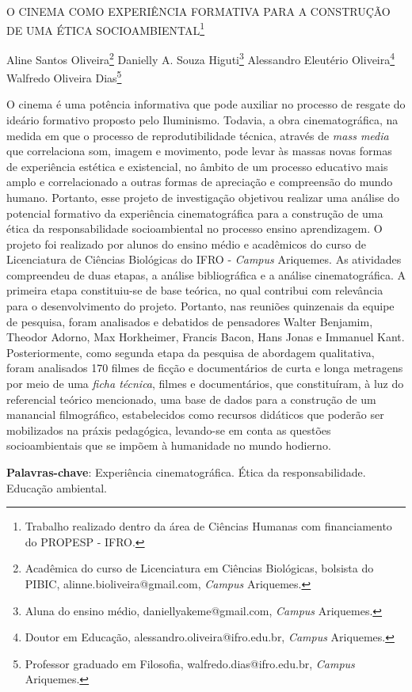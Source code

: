 \documentclass[article,12pt,onesidea,4paper,english,brazil]{abntex2}
\begin{document}
	
	
	\frenchspacing 
	
	\begin{center}
		\LARGE O CINEMA COMO EXPERIÊNCIA FORMATIVA PARA A CONSTRUÇÃO DE UMA
		ÉTICA SOCIOAMBIENTAL\footnote{Trabalho realizado dentro da área de Ciências Humanas com financiamento do PROPESP - IFRO.}
		
		\normalsize
		Aline Santos Oliveira\footnote{Acadêmica do curso de Licenciatura em Ciências Biológicas, bolsista do PIBIC, alinne.bioliveira@gmail.com, \textit{Campus} Ariquemes.} 
		Danielly A. Souza Higuti\footnote{Aluna do ensino médio, daniellyakeme@gmail.com, \textit{Campus} Ariquemes.} 
		Alessandro Eleutério Oliveira\footnote{Doutor em Educação, alessandro.oliveira@ifro.edu.br, \textit{Campus} Ariquemes.} 
		Walfredo Oliveira Dias\footnote{Professor graduado em Filosofia, walfredo.dias@ifro.edu.br, \textit{Campus} Ariquemes.} 
	\end{center}
	
	\noindent O cinema é uma potência informativa que pode auxiliar no processo de resgate do
	ideário formativo proposto pelo Iluminismo. Todavia, a obra cinematográfica, na
	medida em que o processo de reprodutibilidade técnica, através de \textit{mass media} que
	correlaciona som, imagem e movimento, pode levar às massas novas formas de
	experiência estética e existencial, no âmbito de um processo educativo mais amplo e
	correlacionado a outras formas de apreciação e compreensão do mundo humano.
	Portanto, esse projeto de investigação objetivou realizar uma análise do potencial
	formativo da experiência cinematográfica para a construção de uma ética da
	responsabilidade socioambiental no processo ensino aprendizagem. O projeto foi
	realizado por alunos do ensino médio e acadêmicos do curso de Licenciatura de
	Ciências Biológicas do IFRO - \textit{Campus} Ariquemes. As atividades compreendeu de
	duas etapas, a análise bibliográfica e a análise cinematográfica. A primeira etapa
	constituiu-se de base teórica, no qual contribui com relevância para o
	desenvolvimento do projeto. Portanto, nas reuniões quinzenais da equipe de
	pesquisa, foram analisados e debatidos de pensadores Walter Benjamim, Theodor
	Adorno, Max Horkheimer, Francis Bacon, Hans Jonas e Immanuel Kant.
	Posteriormente, como segunda etapa da pesquisa de abordagem qualitativa, foram
	analisados 170 filmes de ficção e documentários de curta e longa metragens por
	meio de uma \textit{ficha técnica}, filmes e documentários, que constituíram, à luz do
	referencial teórico mencionado, uma base de dados para a construção de um
	manancial filmográfico, estabelecidos como recursos didáticos que poderão ser
	mobilizados na práxis pedagógica, levando-se em conta as questões
	socioambientais que se impõem à humanidade no mundo hodierno.
	
	\vspace{\onelineskip}
	
	\noindent
	\textbf{Palavras-chave}: Experiência cinematográfica. Ética da responsabilidade. Educação ambiental.	
	
\end{document}
